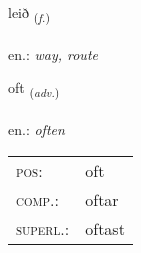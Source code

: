\documentclass[frontgrid, backgrid]{flacards}\usepackage[]{graphicx}\usepackage[]{xcolor}
\begin{document}
\renewcommand{\flhead}{\vskip5pt \fboxsep=0pt {\small\bfseries\footnotesize Nafnorð | Noun}}
\renewcommand{\fcfoot}{\vskip5pt \fboxsep=0pt \hspace{2pt}{\small\bfseries\footnotesize 1K}}

\renewcommand{\blhead}{\vskip5pt {\small\bfseries\footnotesize Nafnorð | Noun }}
\renewcommand{\bcfoot}{\vskip5pt \hspace{2pt}{\small\bfseries\footnotesize 1K}}


{leið \small{\textsubscript{(\textit{f.})}} \\[1ex] %
\textphonetic{[leiːð]} \\
en.: \emph{way, route} \\  [2ex]
\renewcommand*{\arraystretch}{0.8}
}

\renewcommand{\flhead}{\vskip5pt \fboxsep=0pt {\small\bfseries\footnotesize Atviksorð | Adverb}}
\renewcommand{\fcfoot}{\vskip5pt \fboxsep=0pt \hspace{2pt}{\small\bfseries\footnotesize 1K}}

\renewcommand{\blhead}{\vskip5pt {\small\bfseries\footnotesize Atviksorð | Adverb }}
\renewcommand{\bcfoot}{\vskip5pt \hspace{2pt}{\small\bfseries\footnotesize 1K}}


{oft \small{\textsubscript{(\textit{adv.})}} \\[1ex] %
\textphonetic{[ɔft]} \\
en.: \emph{often} \\  [2ex]
\renewcommand*{\arraystretch}{0.8}
\begin{tabular}{ll}
\textsc{pos}: & oft \\ 
\textsc{comp.}: & oftar \\ 
\textsc{superl.}: & oftast \\
\end{tabular}
}
\end{document}
